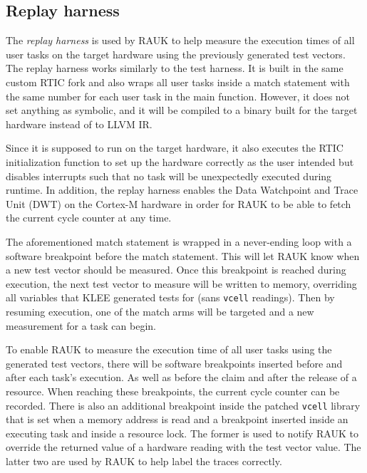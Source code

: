 \subsection{Replay harness}
The \emph{replay harness} is used by RAUK to help measure the execution times of all
user tasks on the target hardware using the previously generated test vectors.
The replay harness works similarly to the test harness. It is built in the same
custom RTIC fork and also wraps all user tasks inside a match statement with
the same number for each user task in the main function. However, it does not
set anything as symbolic, and it will be compiled to a binary built for the
target hardware instead of to LLVM IR\@.

Since it is supposed to run on the target hardware, it also executes the RTIC
initialization function to set up the hardware correctly as the user intended
but disables interrupts such that no task will be unexpectedly executed during
runtime. In addition, the replay harness enables the Data Watchpoint and Trace
Unit (DWT) on the Cortex-M hardware in order for RAUK to be able to fetch the
current cycle counter at any time.

The aforementioned match statement is wrapped in a never-ending loop with a
software breakpoint before the match statement. This will let RAUK know when a
new test vector should be measured. Once this breakpoint is reached during
execution, the next test vector to measure will be written to memory,
overriding all variables that KLEE generated tests for (sans \texttt{vcell}
readings). Then by resuming execution, one of the match arms will be targeted
and a new measurement for a task can begin.

To enable RAUK to measure the execution time of all user tasks using the
generated test vectors, there will be software breakpoints inserted before and
after each task's execution. As well as before the claim and after the release
of a resource. When reaching these breakpoints, the current cycle counter can be
recorded. There is also an additional breakpoint inside the patched
\texttt{vcell} library that is set when a memory address is read and a breakpoint
inserted inside an executing task and inside a resource lock. The former is
used to notify RAUK to override the returned value of a hardware reading with
the test vector value. The latter two are used by RAUK to help label the
traces correctly.



